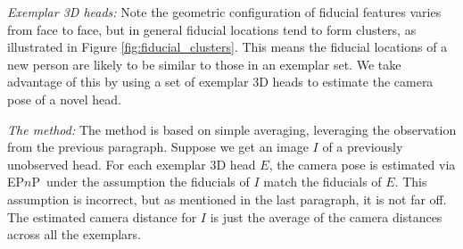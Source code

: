 \documentclass[runningheads]{llncs}
\newcommand {\EPnP} {EP$n$P}
\begin{document}
\textit{Exemplar 3D heads:} Note the geometric configuration of fiducial features varies from face to face, but in general fiducial locations tend to form clusters, as illustrated in Figure \ref{fig:fiducial_clusters}.
This means the fiducial locations of a new person are likely to be similar to those in an exemplar set.
We take advantage of this by using a set of exemplar 3D heads to estimate the camera pose of a novel head.

\textit{The method:} The method is based on simple averaging, leveraging the observation from the previous paragraph.
Suppose we get an image $I$ of a previously unobserved head.
For each exemplar 3D head $E$, the camera pose is estimated via \EPnP~under the assumption the fiducials of $I$ match the fiducials of $E$.
This assumption is incorrect, but as mentioned in the last paragraph, it is not far off.
The estimated camera distance for $I$ is just the average of the camera distances across all the exemplars.
\end{document}
